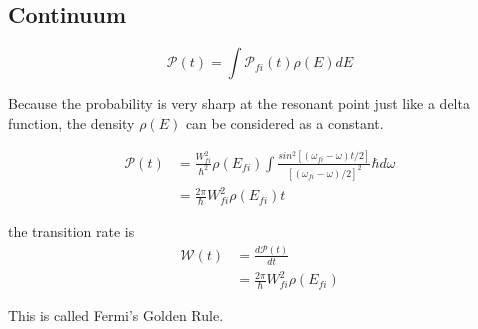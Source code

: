 \documentclass{article}
\begin{document}
	\subsection{Continuum}
		\begin{equation}
			\mathscr{P}(t) = \int\mathscr{P}_{fi}(t)\rho(E)dE
		\end{equation}

		Because the probability is very sharp at the resonant point just like a delta function, the density $\rho(E)$ can be considered as a constant.

		\begin{equation}
		\begin{aligned}
			\mathscr{P}(t) &= \frac{W_{fi}^{2}}{\hbar^{2}}\rho(E_{fi})\int\frac{sin^{2}[(\omega_{fi} - \omega)t/2]}{[(\omega_{fi} - \omega)/2]^{2}}\hbar d\omega\\
						   &= \frac{2\pi}{\hbar}W_{fi}^{2}\rho(E_{fi})t
		\end{aligned}
		\end{equation}

		the transition rate is 
		\begin{equation}
		\begin{aligned}
			\mathscr{W}(t) &= \frac{d\mathscr{P}(t)}{dt}\\
						   &= \frac{2\pi}{\hbar}W_{fi}^{2}\rho(E_{fi})
		\end{aligned}
		\end{equation}

		This is called Fermi's Golden Rule.
\end{document}
